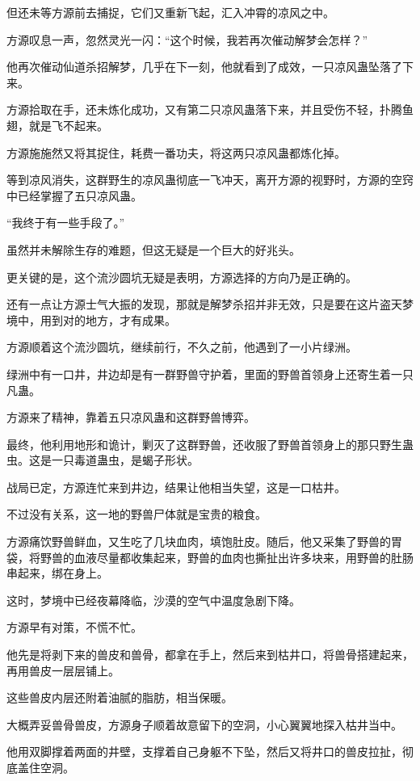 \begin{this_body}
但还未等方源前去捕捉，它们又重新飞起，汇入冲霄的凉风之中。

方源叹息一声，忽然灵光一闪：“这个时候，我若再次催动解梦会怎样？”

他再次催动仙道杀招解梦，几乎在下一刻，他就看到了成效，一只凉风蛊坠落了下来。

方源拾取在手，还未炼化成功，又有第二只凉风蛊落下来，并且受伤不轻，扑腾鱼翅，就是飞不起来。

方源施施然又将其捉住，耗费一番功夫，将这两只凉风蛊都炼化掉。

等到凉风消失，这群野生的凉风蛊彻底一飞冲天，离开方源的视野时，方源的空窍中已经掌握了五只凉风蛊。

“我终于有一些手段了。”

虽然并未解除生存的难题，但这无疑是一个巨大的好兆头。

更关键的是，这个流沙圆坑无疑是表明，方源选择的方向乃是正确的。

还有一点让方源士气大振的发现，那就是解梦杀招并非无效，只是要在这片盗天梦境中，用到对的地方，才有成果。

方源顺着这个流沙圆坑，继续前行，不久之前，他遇到了一小片绿洲。

绿洲中有一口井，井边却是有一群野兽守护着，里面的野兽首领身上还寄生着一只凡蛊。

方源来了精神，靠着五只凉风蛊和这群野兽博弈。

最终，他利用地形和诡计，剿灭了这群野兽，还收服了野兽首领身上的那只野生蛊虫。这是一只毒道蛊虫，是蝎子形状。

战局已定，方源连忙来到井边，结果让他相当失望，这是一口枯井。

不过没有关系，这一地的野兽尸体就是宝贵的粮食。

方源痛饮野兽鲜血，又生吃了几块血肉，填饱肚皮。随后，他又采集了野兽的胃袋，将野兽的血液尽量都收集起来，野兽的血肉也撕扯出许多块来，用野兽的肚肠串起来，绑在身上。

这时，梦境中已经夜幕降临，沙漠的空气中温度急剧下降。

方源早有对策，不慌不忙。

他先是将剥下来的兽皮和兽骨，都拿在手上，然后来到枯井口，将兽骨搭建起来，再用兽皮一层层铺上。

这些兽皮内层还附着油腻的脂肪，相当保暖。

大概弄妥兽骨兽皮，方源身子顺着故意留下的空洞，小心翼翼地探入枯井当中。

他用双脚撑着两面的井壁，支撑着自己身躯不下坠，然后又将井口的兽皮拉扯，彻底盖住空洞。


\end{this_body}
